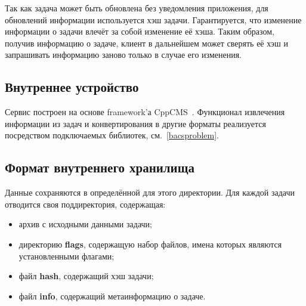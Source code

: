 Так как задача может быть обновлена без уведомления приложения,
для обновлений информации используется хэш задачи.
Гарантируется, что изменение информации о задачи
влечёт за собой изменение её хэша. Таким образом,
получив информацию о задаче,
клиент в дальнейшем может сверять её хэш и запрашивать
информацию заново только в случае его изменения.

\subsection{Внутреннее устройство}
Сервис построен на основе framework'а CppCMS~\cite{cppcms}.
Функционал извлечения информации из задач и конвертирования
в другие форматы реализуется посредством подключаемых библиотек, см.~\ref{bacsproblem}.

\subsection{Формат внутреннего хранилища}
Данные сохраняются в определённой для этого директории.
Для каждой задачи отводится своя поддиректория, содержащая:
\begin{itemize}
    \item архив с исходными данными задачи;
    \item директорию \textbf{flags}, содержащую набор файлов,
        имена которых являются установленными флагами;
    \item файл \textbf{hash}, содержащий хэш задачи;
    \item файл \textbf{info}, содержащий метаинформацию о задаче.
\end{itemize}
